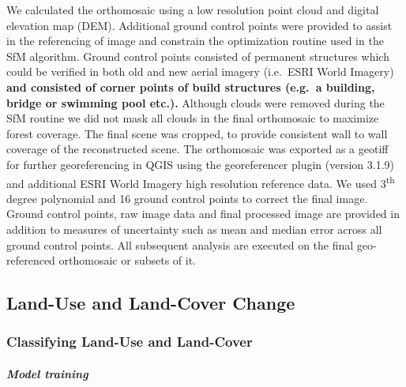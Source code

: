 \documentclass[remote sensing,article,submit,moreauthors,pdftex]{mdpi}
\begin{document}
We calculated the orthomosaic using a low resolution point cloud and
digital elevation map (DEM). Additional ground control points were
provided to assist in the referencing of image and constrain the
optimization routine used in the SfM algorithm. Ground control points
consisted of permanent structures which could be verified in both old
and new aerial imagery (i.e.~ESRI World Imagery) \textbf{and consisted
of corner points of build structures (e.g.~a building, bridge or
swimming pool etc.).} Although clouds were removed during the SfM
routine we did not mask all clouds in the final orthomosaic to maximize
forest coverage. The final scene was cropped, to provide consistent wall
to wall coverage of the reconstructed scene. The orthomosaic was
exported as a geotiff for further georeferencing in QGIS
\citep{qgisdevelopmentteam2018} using the georeferencer plugin (version
3.1.9) and additional ESRI World Imagery high resolution reference data.
We used 3\textsuperscript{th} degree polynomial and 16 ground control
points to correct the final image. Ground control points, raw image data
and final processed image are provided in addition to measures of
uncertainty such as mean and median error across all ground control
points. All subsequent analysis are executed on the final geo-referenced
orthomosaic or subsets of it.

\hypertarget{land-use-and-land-cover-change}{%
\subsection{Land-Use and Land-Cover
Change}\label{land-use-and-land-cover-change}}

\hypertarget{classifying-land-use-and-land-cover}{%
\subsubsection{Classifying Land-Use and
Land-Cover}\label{classifying-land-use-and-land-cover}}

\hypertarget{model-training}{%
\paragraph{\texorpdfstring{\emph{Model
training}}{Model training}}\label{model-training}}
\end{document}
